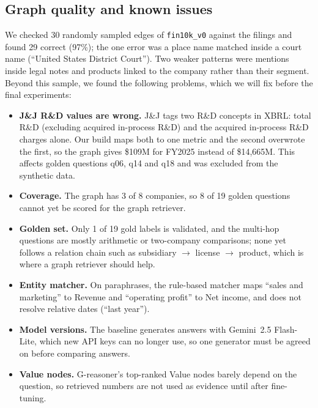 \documentclass[10pt,twocolumn,letterpaper]{article}
\begin{document}
\subsection{Graph quality and known issues}
\label{sec:exp-issues}
We checked 30 randomly sampled edges of \texttt{fin10k\_v0} against the filings and found 29
correct (97\%); the one error was a place name matched inside a court name (``United States
District Court''). Two weaker patterns were mentions inside legal notes and products linked to the
company rather than their segment. Beyond this sample, we found the following problems, which we
will fix before the final experiments:
\begin{itemize}
  \item \textbf{J\&J R\&D values are wrong.} J\&J tags two R\&D concepts in XBRL: total R\&D
  (excluding acquired in-process R\&D) and the acquired in-process R\&D charges alone. Our build
  maps both to one metric and the second overwrote the first, so the graph gives \$109M for FY2025 instead of \$14,665M. This affects
  golden questions q06, q14 and q18 and was excluded from the synthetic data.
  \item \textbf{Coverage.} The graph has 3 of 8 companies, so 8 of 19 golden questions cannot yet be
  scored for the graph retriever.
  \item \textbf{Golden set.} Only 1 of 19 gold labels is validated, and the multi-hop questions
  are mostly arithmetic or two-company comparisons; none yet follows a relation chain such as
  subsidiary $\rightarrow$ license $\rightarrow$ product, which is where a graph retriever should help.
  \item \textbf{Entity matcher.} On paraphrases, the rule-based matcher maps ``sales and marketing''
  to Revenue and ``operating profit'' to Net income, and does not resolve relative dates
  (``last year'').
  \item \textbf{Model versions.} The baseline generates answers with Gemini~2.5 Flash-Lite, which
  new API keys can no longer use, so one generator must be agreed on before comparing answers.
  \item \textbf{Value nodes.} G-reasoner's top-ranked Value nodes barely depend on the question, so
  retrieved numbers are not used as evidence until after fine-tuning.
\end{itemize}

\end{document}
